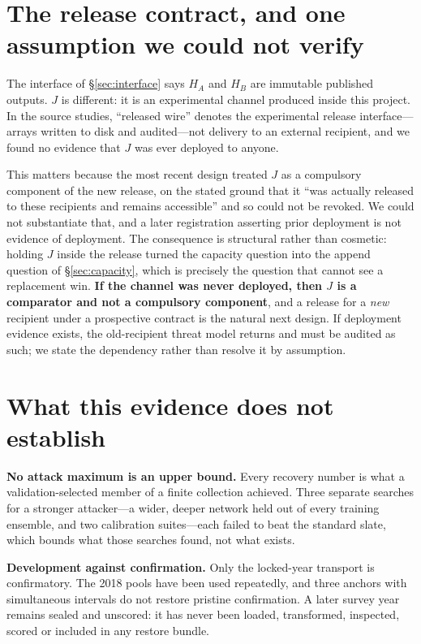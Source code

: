 \documentclass[conference]{IEEEtran}
\begin{document}
\section{The release contract, and one assumption we could not verify}
\label{sec:contract}

The interface of \S\ref{sec:interface} says $H_A$ and $H_B$ are immutable published outputs. $J$ is
different: it is an experimental channel produced inside this project. In the source studies, ``released
wire'' denotes the experimental release interface---arrays written to disk and audited---not delivery to
an external recipient, and we found no evidence that $J$ was ever deployed to anyone.

This matters because the most recent design treated $J$ as a compulsory component of the new release, on
the stated ground that it ``was actually released to these recipients and remains accessible'' and so
could not be revoked. We could not substantiate that, and a later registration asserting prior deployment
is not evidence of deployment. The consequence is structural rather than cosmetic: holding $J$ inside the
release turned the capacity question into the append question of \S\ref{sec:capacity}, which is precisely
the question that cannot see a replacement win. \textbf{If the channel was never deployed, then $J$ is a
comparator and not a compulsory component}, and a release for a \emph{new} recipient under a prospective
contract is the natural next design. If deployment evidence exists, the old-recipient threat model
returns and must be audited as such; we state the dependency rather than resolve it by assumption.

\section{What this evidence does not establish}
\label{sec:limits}

\textbf{No attack maximum is an upper bound.} Every recovery number is what a validation-selected member
of a finite collection achieved. Three separate searches for a stronger attacker---a wider, deeper
network held out of every training ensemble, and two calibration suites---each failed to beat the
standard slate, which bounds what those searches found, not what exists.

\textbf{Development against confirmation.} Only the locked-year transport is confirmatory. The 2018 pools
have been used repeatedly, and three anchors with simultaneous intervals do not restore pristine
confirmation. A later survey year remains sealed and unscored: it has never been loaded, transformed,
inspected, scored or included in any restore bundle.
\end{document}
